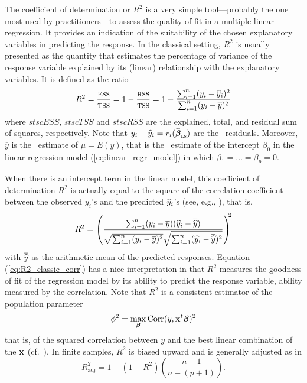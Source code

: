 The coefficient of determination or $R^2$ is a very simple tool---probably
the one most used by practitioners---to assess the quality of fit in a multiple
linear regression. It provides an indication of the suitability of the chosen
explanatory variables in predicting the response. In the classical setting,
$R^2$ is usually presented as the quantity that estimates the percentage of
variance of the response variable explained by its (linear) relationship with
the explanatory variables. It is defined as the ratio
%
\begin{equation}
    \label{eq:R2_classic_SS}
    R^2 = \frac{\stsc{ESS}}{\stsc{TSS}} = 1-\frac{\stsc{RSS}}{\stsc{TSS}}
          = 1 - \frac{\sum_{i=1}^{n} (y_i - \sthat{y}_i)^2} 
                {\sum_{i=1}^{n} (y_i - \overline{y})^2}
\end{equation}
%
where $stsc{ESS}$, $stsc{TSS}$ and $stsc{RSS}$ are the explained, total, and
residual sum of squares, respectively. Note that $y_i - \sthat{y}_i =
r_i(\sthat{\boldsymbol\beta}_\stsc{LS})$ are the ~residuals. Moreover,
$\overline{y}$ is the ~estimate of $\mu = E(y)$, that is the 
~estimate of the intercept $\beta_0$ in the linear regression model
(\ref{eq:linear_regr_model}) in which $\beta_1 = \dots = \beta_p = 0$.

When there is an intercept term in the linear model, this coefficient of
determination $R^2$ is actually equal to the square of the correlation
coefficient between the observed $y_i$'s and the predicted $\widehat{y}_i$'s 
(see, e.g., \citealp{Greene:1997}), that is,
%
\begin{equation}
    \label{eq:R2_classic_corr}
    R^2 = \left(\frac{\sum_{i=1}^{n} (y_i - \overline{y})(\sthat{y}_i - \overline{\sthat{y}})}
          {\sqrt{\sum_{i=1}^{n} (y_i - \overline{y})^2} 
           \sqrt{\sum_{i=1}^{n} (\sthat{y}_i - \overline{\sthat{y}})^2}}\right)^{\!\!2}
\end{equation}
%
with $\overline{\widehat{y}}$ as the arithmetic mean of the predicted responses.
Equation (\ref{eq:R2_classic_corr}) has a nice interpretation in that $R^2$
measures the goodness of fit of the regression model by its ability to predict
the response variable, ability measured by the correlation. Note that $R^2$ is
a consistent estimator of the population parameter
%
\begin{equation}
    \label{eq:phi2}
    \phi^2 = \max_{\boldsymbol\beta} \mathrm{Corr}(y, \mathbf x^t\boldsymbol\beta)^2
\end{equation}
%
that is, of the squared correlation between $y$ and the best linear
combination of the $\mathbf x$ (cf.\ \citealp{Anderson:1984}). In finite
samples, $R^2$ is biased upward and is generally adjusted as in
%
\begin{equation}
    \label{eq:R2_adj}
    R_{\mathrm{adj}}^2 = 1 - \left(1-R^2\right) \left(\frac{n-1}{n-(p+1)}\right).
\end{equation}                                                              

